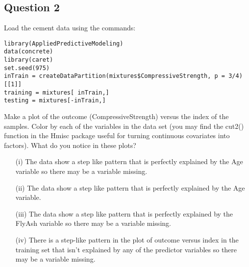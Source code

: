 \documentclass[DSS8main.tex]{subfiles}
\begin{document}
\subsection*{Question 2}
Load the cement data using the commands:
\begin{framed}
\begin{verbatim}
library(AppliedPredictiveModeling)
data(concrete)
library(caret)
set.seed(975)
inTrain = createDataPartition(mixtures$CompressiveStrength, p = 3/4)[[1]]
training = mixtures[ inTrain,]
testing = mixtures[-inTrain,]
\end{verbatim}
\end{framed}
Make a plot of the outcome (CompressiveStrength) versus the index of the samples. Color by each of the variables in the data set (you may find the cut2() function in the Hmisc package useful for turning continuous covariates into factors). What do you notice in these plots?
\begin{itemize}
\item[(i)] The data show a step like pattern that is perfectly explained by the Age variable so there may be a variable missing.
\item[(ii)] The data show a step like pattern that is perfectly explained by the Age variable.
\item[(iii)] The data show a step like pattern that is perfectly explained by the FlyAsh variable so there may be a variable missing.
\item[(iv)] There is a step-like pattern in the plot of outcome versus index in the training set that isn't explained by any of the predictor variables so there may be a variable missing.
\end{itemize}
\end{document}
